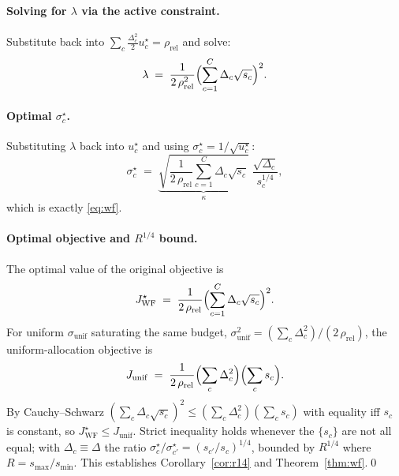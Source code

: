 \paragraph{Solving for $\lambda$ via the active constraint.}
Substitute back into $\sum_c \tfrac{\Delta_c^{2}}{2}u_c^{\star} =
\rho_{\mathrm{rel}}$ and solve:
\begin{equation*}
\lambda \;=\; \frac{1}{2\,\rho_{\mathrm{rel}}^{2}}
              \Bigl(\sum_{c=1}^{C}\Delta_c\sqrt{s_c}\Bigr)^{2}.
\end{equation*}

\paragraph{Optimal $\sigma_c^{\star}$.}
Substituting $\lambda$ back into $u_c^{\star}$ and using
$\sigma_c^{\star} = 1/\sqrt{u_c^{\star}}$:
\begin{equation*}
\sigma_c^{\star}
 \;=\;
 \underbrace{\sqrt{\frac{1}{2\,\rho_{\mathrm{rel}}}\sum_{c=1}^{C}\Delta_c\sqrt{s_c}}}_{\displaystyle\kappa}
 \;\frac{\sqrt{\Delta_c}}{s_c^{1/4}},
\end{equation*}
which is exactly \eqref{eq:wf}.

\paragraph{Optimal objective and $R^{1/4}$ bound.}
The optimal value of the original objective is
\begin{equation}
J_{\mathrm{WF}}^{\star}
 \;=\; \frac{1}{2\,\rho_{\mathrm{rel}}}
       \Bigl(\sum_{c=1}^{C}\Delta_c\sqrt{s_c}\Bigr)^{2}.
\label{eq:wf-obj}
\end{equation}
For uniform $\sigma_{\mathrm{unif}}$ saturating the same budget,
$\sigma_{\mathrm{unif}}^{2} = (\sum_c \Delta_c^{2})/(2\,\rho_{\mathrm{rel}})$,
the uniform-allocation objective is
\begin{equation}
J_{\mathrm{unif}}
 \;=\; \frac{1}{2\,\rho_{\mathrm{rel}}}
       \Bigl(\sum_{c}\Delta_c^{2}\Bigr)\Bigl(\sum_{c}s_c\Bigr).
\label{eq:unif-obj}
\end{equation}
By Cauchy--Schwarz $(\sum_c \Delta_c\sqrt{s_c})^{2} \le
(\sum_c \Delta_c^{2})(\sum_c s_c)$ with equality iff $s_c$ is
constant, so $J_{\mathrm{WF}}^{\star} \le J_{\mathrm{unif}}$. Strict
inequality holds whenever the $\{s_c\}$ are not all equal; with
$\Delta_c \equiv \Delta$ the ratio $\sigma^{\star}_c / \sigma^{\star}_{c'} =
(s_{c'}/s_c)^{1/4}$, bounded by $R^{1/4}$ where $R = s_{\max}/s_{\min}$.
This establishes Corollary~\ref{cor:r14} and Theorem~\ref{thm:wf}.\qed

